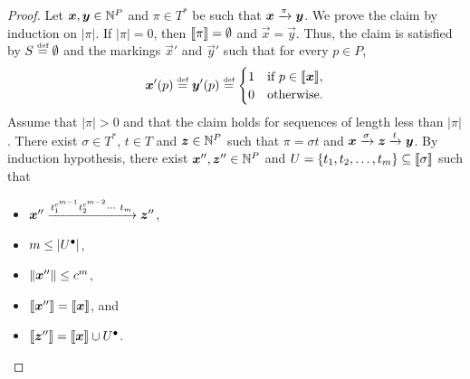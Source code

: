 \begin{proof}
  Let $\bm{x}, \bm{y} \in \mathbb{N}^P$ and $\pi \in T^*$ be such that
  $\bm{x} \xrightarrow{\pi} \bm{y}$. We prove the claim by induction on
  $|\pi|$. If $|\pi| = 0$, then $\llbracket\pi\rrbracket = \emptyset$ and $\vec{x}
  = \vec{y}$. Thus, the claim is satisfied by $S \stackrel{\scriptscriptstyle\text{def}}{=} \emptyset$ and
  the markings $\vec{x}'$ and $\vec{y}'$ such that for every $p \in
  P$,
  $$
  \bm{x}'(p) \stackrel{\scriptscriptstyle\text{def}}{=} \bm{y}'(p) \stackrel{\scriptscriptstyle\text{def}}{=}
  \begin{cases}
    1 & \text{if } p \in \llbracket\bm{x}\rrbracket, \\
    0 & \text{otherwise}.
  \end{cases}
  $$ Assume that $|\pi| > 0$ and that the claim holds for sequences of
  length less than $|\pi|$. There exist $\sigma \in T^*$, $t \in T$
  and $\bm{z} \in \mathbb{N}^P$ such that $\pi = \sigma t$ and $\bm{x}
  \xrightarrow{\sigma} \bm{z} \xrightarrow{t} \bm{y}$. By induction hypothesis,
  there exist $\bm{x}'', \bm{z}'' \in \mathbb{N}^P$ and $U = \{t_1, t_2,
  \ldots, t_m\} \subseteq \llbracket\sigma\rrbracket$ such that
  \begin{itemize}
  \item $\bm{x}'' \xrightarrow{t_1^{c^{m-1}} t_2^{c^{m-2}} \cdots\ t_m}
    \bm{z}''$,

  \item $m \leq |{U^\bullet}|$,

  \item $\lVert\bm{x}''\rVert \leq c^m$,

  \item $\llbracket\bm{x}''\rrbracket = \llbracket\bm{x}\rrbracket$, and 

  \item $\llbracket\bm{z}''\rrbracket = \llbracket\bm{x}\rrbracket \cup {U^\bullet}$.
  \end{itemize}
  

\end{proof}
